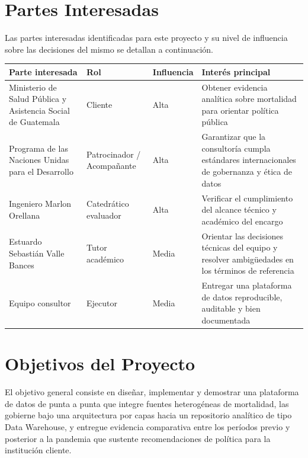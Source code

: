 \documentclass[12pt,a4paper]{article}
\begin{document}
\section{Partes Interesadas}

Las partes interesadas identificadas para este proyecto y su nivel de influencia sobre las
decisiones del mismo se detallan a continuación.

\vspace{6pt}
{\small
\begin{tabularx}{\linewidth}{@{} X l l X @{}}
  \toprule
  \textbf{Parte interesada} & \textbf{Rol} & \textbf{Influencia} & \textbf{Interés principal} \\
  \midrule
  Ministerio de Salud Pública y Asistencia Social de Guatemala
    & Cliente
    & Alta
    & Obtener evidencia analítica sobre mortalidad para orientar política pública \\[5pt]
  Programa de las Naciones Unidas para el Desarrollo
    & Patrocinador / Acompañante
    & Alta
    & Garantizar que la consultoría cumpla estándares internacionales de gobernanza
      y ética de datos \\[5pt]
  Ingeniero Marlon Orellana
    & Catedrático evaluador
    & Alta
    & Verificar el cumplimiento del alcance técnico y académico del encargo \\[5pt]
  Estuardo Sebastián Valle Bances
    & Tutor académico
    & Media
    & Orientar las decisiones técnicas del equipo y resolver ambigüedades en los
      términos de referencia \\[5pt]
  Equipo consultor
    & Ejecutor
    & Media
    & Entregar una plataforma de datos reproducible, auditable y bien documentada \\
  \bottomrule
\end{tabularx}
}

\section{Objetivos del Proyecto}

El objetivo general consiste en diseñar, implementar y demostrar una plataforma de datos de
punta a punta que integre fuentes heterogéneas de mortalidad, las gobierne bajo una arquitectura
por capas hacia un repositorio analítico de tipo Data Warehouse, y entregue evidencia
comparativa entre los períodos previo y posterior a la pandemia que sustente recomendaciones de
política para la institución cliente.
\end{document}
